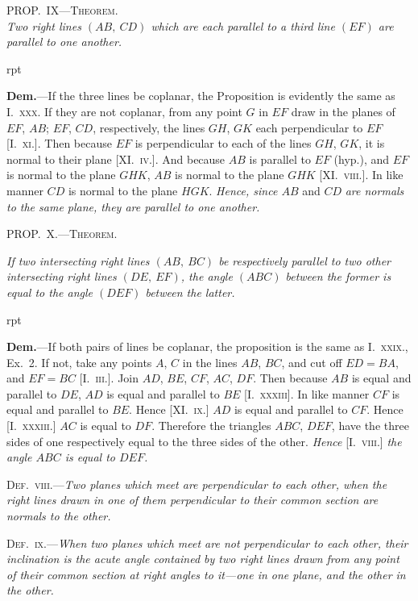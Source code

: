 \documentclass[oneside]{book}
\newcommand\myprop[2]{
\bigskip\Needspace*{4\baselineskip}\begin{center}\textsc{#1}\\\medskip\emph{#2}\par\end{center}
}
\newcommand\mypropl[2]{
\bigskip\Needspace*{4\baselineskip}\begin{center}\textsc{#1}\end{center}
\hspace{\parindent}\emph{#2}\par\medskip
}
\newcommand\imgflow[3]{
\setcounter{wrapwidth}{#1}
\begin{wrapfigure}[#2]{r}{\value{wrapwidth}pt}
\begin{center}
\vspace{-0.3in}
\end{center}
\end{wrapfigure}
}
\begin{document}
\myprop{PROP\@.~IX---Theorem.}{Two right lines $(AB,\ CD)$ which are each parallel to a
third line $(EF)$ are parallel to one another.}

\imgflow{133}{7}{f223}

\textbf{Dem.}---If the three lines be coplanar, the Proposition
is evidently the same
as I.~\textsc{xxx}. If they are not
coplanar, from any point $G$
in $EF$ draw in the planes of
$EF$, $AB$; $EF$, $CD$, respectively,
the lines $GH$, $GK$ each
perpendicular\label{perpendiclar}
to $EF$ [I.~\textsc{xi.}].
Then because $EF$ is perpendicular to each of the lines
$GH$, $GK$, it is normal to their plane [XI\@.~\textsc{iv.}]. And
because $AB$ is parallel to $EF$ (hyp.), and $EF$ is normal
to the plane $GHK$, $AB$ is normal to the plane $GHK$
[XI\@.~\textsc{viii.}]. In like manner $CD$ is normal to the plane
$HGK$. \emph{Hence, since $AB$} and $CD$ \emph{are normals to the same
plane, they are parallel to one another.}

\mypropl{PROP\@.~X.---Theorem.}{If two intersecting right lines $(AB,\ BC)$ be respectively
parallel to two other intersecting right lines $(DE,\ EF)$,
the angle $(ABC)$ between the former is equal to the angle
$(DEF)$ between the latter.}

\imgflow{120}{10}{f224}

\textbf{Dem.}---If both pairs of lines be coplanar, the proposition
is the same as I.~\textsc{xxix.},
Ex.~2. If not, take any points
$A$, $C$ in the lines $AB$, $BC$, and
cut off $ED = BA$, and $EF = BC$
[I.~\textsc{iii.}]. Join $AD$, $BE$, $CF$,
$AC$, $DF$. Then because $AB$ is
equal and parallel to $DE$, $AD$
is equal and parallel to $BE$
[I.~\textsc{xxxiii}]. In like manner
$CF$ is equal and parallel to $BE$.
Hence [XI\@.~\textsc{ix.}] $AD$ is equal
and parallel to $CF$. Hence [I.~\textsc{xxxiii.}] $AC$ is equal to
$DF$. Therefore the triangles $ABC$, $DEF$, have the
three sides of one respectively equal to the three sides
of the other. \emph{Hence} [I.~\textsc{viii.}] \emph{the angle $ABC$ is equal
to $DEF$.}

\textsc{Def.~viii.}---\emph{Two planes which meet are perpendicular
to each other, when the right lines drawn in one of them
perpendicular to their common section are normals to the
other.}

\textsc{Def.~ix.}---\emph{When two planes which meet are not perpendicular
to each other, their inclination is the acute angle
contained by two right lines drawn from any point of their
common section at right angles to it---one in one plane, and
the other in the other.}
\end{document}
